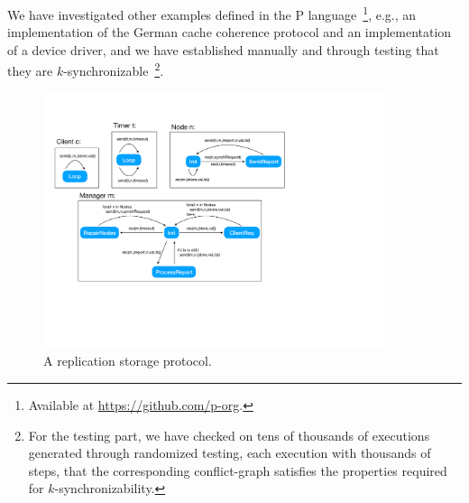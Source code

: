 We have investigated other examples defined in the P language~\footnote{Available at \url{https://github.com/p-org}.}, e.g., an implementation of the German cache coherence protocol and an implementation of a device driver, and we have established manually and through testing that they are $k$-synchronizable~\footnote{For the testing part, we have checked on tens of thousands of executions generated through randomized testing, each execution with thousands of steps, that the corresponding conflict-graph satisfies the properties required for $k$-synchronizability.}.


%

%

\begin{figure}[t]
\includegraphics[width=10cm]{replication.pdf}
\caption{A replication storage protocol.}
\label{fig:replication}
\end{figure}

